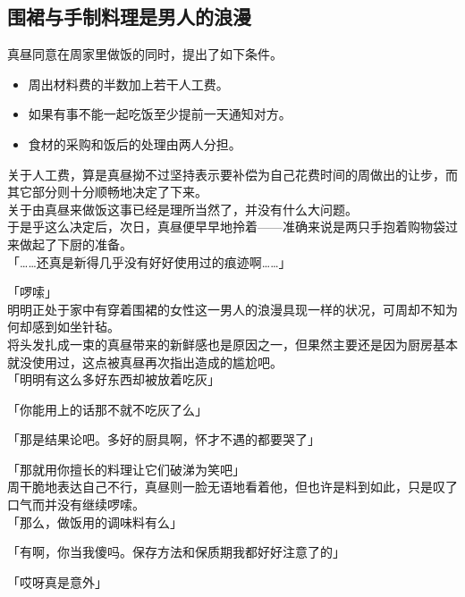 \subsection{围裙与手制料理是男人的浪漫}

真昼同意在周家里做饭的同时，提出了如下条件。\\

\begin{itemize}
    \item 周出材料费的半数加上若干人工费。
    \item 如果有事不能一起吃饭至少提前一天通知对方。
    \item 食材的采购和饭后的处理由两人分担。
\end{itemize}

关于人工费，算是真昼拗不过坚持表示要补偿为自己花费时间的周做出的让步，而其它部分则十分顺畅地决定了下来。\\

关于由真昼来做饭这事已经是理所当然了，并没有什么大问题。\\

于是乎这么决定后，次日，真昼便早早地拎着——准确来说是两只手抱着购物袋过来做起了下厨的准备。\\

「……还真是新得几乎没有好好使用过的痕迹啊……」

「啰嗦」\\

明明正处于家中有穿着围裙的女性这一男人的浪漫具现一样的状况，可周却不知为何却感到如坐针毡。\\

将头发扎成一束的真昼带来的新鲜感也是原因之一，但果然主要还是因为厨房基本就没使用过，这点被真昼再次指出造成的尴尬吧。\\

「明明有这么多好东西却被放着吃灰」

「你能用上的话那不就不吃灰了么」

「那是结果论吧。多好的厨具啊，怀才不遇的都要哭了」

「那就用你擅长的料理让它们破涕为笑吧」\\

周干脆地表达自己不行，真昼则一脸无语地看着他，但也许是料到如此，只是叹了口气而并没有继续啰嗦。\\

「那么，做饭用的调味料有么」

「有啊，你当我傻吗。保存方法和保质期我都好好注意了的」

「哎呀真是意外」

